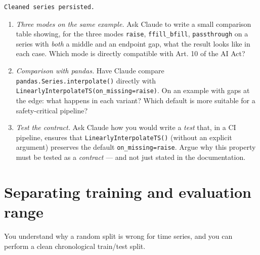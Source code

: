 \documentclass[
  english,
  letterpaper,
]{scrbook}
\providecommand{\tightlist}{%
  \setlength{\itemsep}{0pt}\setlength{\parskip}{0pt}}
\begin{document}
\begin{verbatim}
Cleaned series persisted.
\end{verbatim}

\begin{tcolorbox}[enhanced jigsaw, arc=.35mm, bottomrule=.15mm, bottomtitle=1mm, breakable, colback=white, colbacktitle=quarto-callout-tip-color!10!white, colframe=quarto-callout-tip-color-frame, coltitle=black, left=2mm, leftrule=.75mm, opacityback=0, opacitybacktitle=0.6, rightrule=.15mm, title=\textcolor{quarto-callout-tip-color}{\faLightbulb}\hspace{0.5em}{Exercises (with Claude)}, titlerule=0mm, toprule=.15mm, toptitle=1mm]

\begin{enumerate}
\def\labelenumi{\arabic{enumi}.}
\tightlist
\item
  \emph{Three modes on the same example.} Ask Claude to write a small
  comparison table showing, for the three modes \texttt{raise},
  \texttt{ffill\_bfill}, \texttt{passthrough} on a series with
  \emph{both} a middle and an endpoint gap, what the result looks like
  in each case. Which mode is directly compatible with Art. 10 of the AI
  Act?
\item
  \emph{Comparison with pandas.} Have Claude compare
  \texttt{pandas.Series.interpolate()} directly with
  \texttt{LinearlyInterpolateTS(on\_missing=\textquotesingle{}raise\textquotesingle{})}.
  On an example with gaps at the edge: what happens in each variant?
  Which default is more suitable for a safety-critical pipeline?
\item
  \emph{Test the contract.} Ask Claude how you would write a \emph{test}
  that, in a CI pipeline, ensures that \texttt{LinearlyInterpolateTS()}
  (without an explicit argument) preserves the default
  \texttt{on\_missing=\textquotesingle{}raise\textquotesingle{}}. Argue
  why this property must be tested as a \emph{contract} --- and not just
  stated in the documentation.
\end{enumerate}

\end{tcolorbox}


\chapter{Separating training and evaluation range}\label{sec-split}

\begin{tcolorbox}[enhanced jigsaw, arc=.35mm, bottomrule=.15mm, bottomtitle=1mm, breakable, colback=white, colbacktitle=quarto-callout-note-color!10!white, colframe=quarto-callout-note-color-frame, coltitle=black, left=2mm, leftrule=.75mm, opacityback=0, opacitybacktitle=0.6, rightrule=.15mm, title=\textcolor{quarto-callout-note-color}{\faInfo}\hspace{0.5em}{Learning objective}, titlerule=0mm, toprule=.15mm, toptitle=1mm]

You understand why a random split is wrong for time series, and you can
perform a clean chronological train/test split.

\end{tcolorbox}
\end{document}
